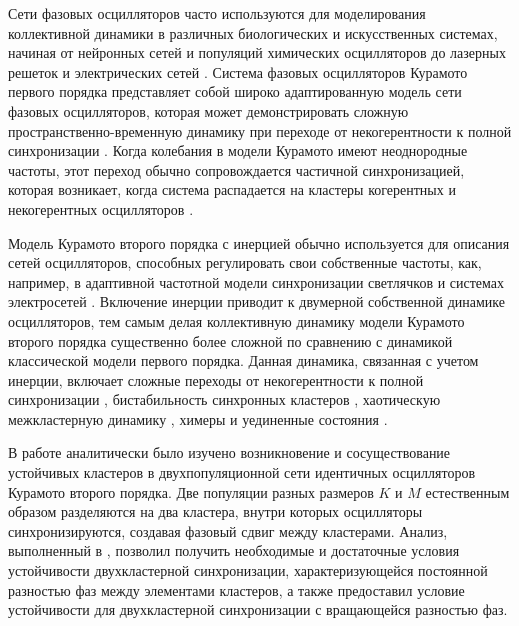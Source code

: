 Сети фазовых осцилляторов часто используются для моделирования
коллективной динамики в различных биологических и
искусственных системах, начиная от нейронных сетей \cite{Hoppensteadt:Izhikevich} и
популяций химических осцилляторов \cite{Tinsley:Nkomo} до лазерных решеток \cite{Ding:Belykh}
и электрических сетей \cite{Dorfler:Chertkov}. Система
фазовых осцилляторов Курамото первого порядка \cite{Kuramoto,Strogatz} представляет собой широко адаптированную модель
сети фазовых осцилляторов, которая может демонстрировать сложную
пространственно-временную динамику при переходе от
некогерентности к полной синхронизации \cite{Acebron:Bonilla,Barreto:Hunt,Ott:Antonsen,Hong:Chate,Pikovsky:Rosenblum,Maistrenko:Popovych,Dorfler:Bullo,Martens:Barreto}.
Когда колебания в модели Курамото имеют неоднородные частоты, этот переход обычно
сопровождается частичной синхронизацией, которая возникает, когда система
распадается на кластеры когерентных и некогерентных осцилляторов
\cite{Acebron:Bonilla,Martens:Barreto,Laing}.

Модель Курамото второго порядка с инерцией обычно используется для описания сетей осцилляторов,
способных регулировать свои собственные частоты, как, например, в адаптивной частотной
модели синхронизации светлячков \cite{Ermentrout} и системах электросетей \cite{Tumash}.
Включение инерции приводит к двумерной собственной динамике осцилляторов,
тем самым делая коллективную динамику модели Курамото второго порядка существенно более
сложной по сравнению с динамикой классической модели первого порядка.
Данная динамика, связанная с учетом инерции, включает сложные переходы от некогерентности
к полной синхронизации \cite{Tanaka:Review,Tanaka:Physica,Peron,Munyaev:Smirnov,Komarov:Gupta,Olmi:Navas,Barabash:Belykh},
бистабильность синхронных кластеров \cite{Belykh:Brister}, хаотическую межкластерную динамику \cite{Brister:Belykh},
химеры \cite{Olmi:Chaos, Maistrenko:Brezetsky, Medvedev:Mizuhara} и уединенные состояния \cite{Jaros:Maistrenko, Jaros:Brezetsky}.

В работе \cite{Belykh:Brister} аналитически было изучено возникновение и сосуществование устойчивых
кластеров в двухпопуляционной сети идентичных осцилляторов Курамото второго порядка.
Две популяции разных размеров $K$ и $M$ естественным образом разделяются на два кластера,
внутри которых осцилляторы синхронизируются, создавая фазовый сдвиг между кластерами.
Анализ, выполненный в \cite{Belykh:Brister}, позволил получить необходимые и достаточные условия устойчивости
двухкластерной синхронизации, характеризующейся постоянной разностью фаз между элементами кластеров, а
также предоставил условие устойчивости для двухкластерной синхронизации с
вращающейся разностью фаз.


